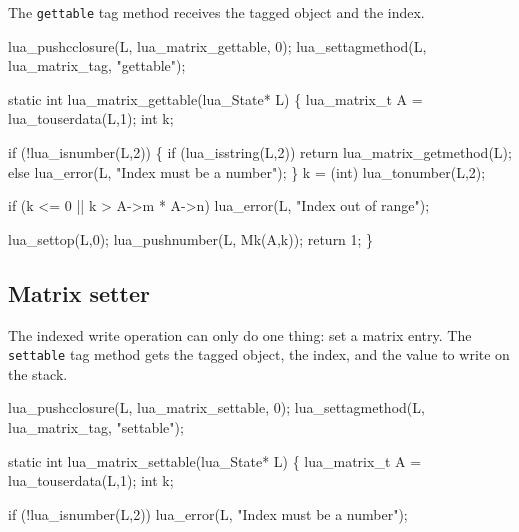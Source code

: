 The {\tt{}gettable} tag method receives the tagged object and the index.

\nwenddocs{}\plusendmoddef
lua_pushcclosure(L, lua_matrix_gettable, 0);
lua_settagmethod(L, lua_matrix_tag, "gettable");
\nwendcode{}\nwdocspar

\nwenddocs{}\plusendmoddef
static int lua_matrix_gettable(lua_State* L)
\{
    lua_matrix_t A = lua_touserdata(L,1);
    int k;

    if (!lua_isnumber(L,2)) \{
        if (lua_isstring(L,2))
            return lua_matrix_getmethod(L);
        else
            lua_error(L, "Index must be a number");
    \}
    k = (int) lua_tonumber(L,2);

    if (k <= 0 || k > A->m * A->n)
        lua_error(L, "Index out of range");

    lua_settop(L,0);
    lua_pushnumber(L, Mk(A,k));
    return 1;
\}

\nwendcode{}\nwdocspar


\subsection{Matrix setter}

The indexed write operation can only do one thing: set a matrix
entry.  The {\tt{}settable} tag method gets the tagged object,
the index, and the value to write on the stack.

\nwenddocs{}\plusendmoddef
lua_pushcclosure(L, lua_matrix_settable, 0);
lua_settagmethod(L, lua_matrix_tag, "settable");
\nwendcode{}\nwdocspar

\nwenddocs{}\plusendmoddef
static int lua_matrix_settable(lua_State* L)
\{
    lua_matrix_t A = lua_touserdata(L,1);
    int k;

    if (!lua_isnumber(L,2))
        lua_error(L, "Index must be a number");

